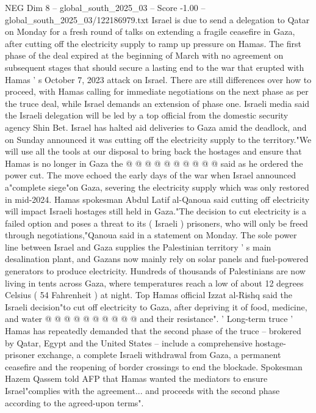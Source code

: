 \begin{textsample}{NEG Dim 8 – global\_south\_2025\_03 – Score -1.00 – global\_south\_2025\_03/122186979.txt}  \label{ex:f8_neg_300}
Israel is due to send a delegation to Qatar on Monday for a fresh round of talks on extending a fragile ceasefire in Gaza, after cutting off the electricity supply to ramp up pressure on Hamas.
The first phase of the deal expired at the beginning of March with no agreement on subsequent stages that should secure a lasting end to the war that erupted with Hamas ' s October 7, 2023 attack on Israel.
There are still differences over how to proceed, with Hamas calling for immediate negotiations on the next phase as per the truce deal, while Israel demands an extension of phase one.
Israeli media said the Israeli delegation will be led by a top official from the domestic security agency Shin Bet.
Israel has halted aid deliveries to Gaza amid the deadlock, and on Sunday announced it was cutting off the electricity supply to the territory."We will use all the tools at our disposal to bring back the hostages and ensure that Hamas is no longer in Gaza the @ @ @ @ @ @ @ @ @ @ said as he ordered the power cut.
The move echoed the early days of the war when Israel announced a"complete siege"on Gaza, severing the electricity supply which was only restored in mid-2024.
Hamas spokesman Abdul Latif al-Qanoua said cutting off electricity will impact Israeli hostages still held in Gaza."The decision to cut electricity is a failed option and poses a threat to its ( Israeli ) prisoners, who will only be freed through negotiations,"Qanoua said in a statement on Monday.
The sole power line between Israel and Gaza supplies the Palestinian territory ' s main desalination plant, and Gazans now mainly rely on solar panels and fuel-powered generators to produce electricity.
Hundreds of thousands of Palestinians are now living in tents across Gaza, where temperatures reach a low of about 12 degrees Celsius ( 54 Fahrenheit ) at night.
Top Hamas official Izzat al-Rishq said the Israeli decision"to cut off electricity to Gaza, after depriving it of food, medicine, and water @ @ @ @ @ @ @ @ @ @ and their resistance". ' Long-term truce ' Hamas has repeatedly demanded that the second phase of the truce -- brokered by Qatar, Egypt and the United States -- include a comprehensive hostage-prisoner exchange, a complete Israeli withdrawal from Gaza, a permanent ceasefire and the reopening of border crossings to end the blockade.
Spokesman Hazem Qassem told AFP that Hamas wanted the mediators to ensure Israel"complies with the agreement... and proceeds with the second phase according to the agreed-upon terms".

\end{textsample}

